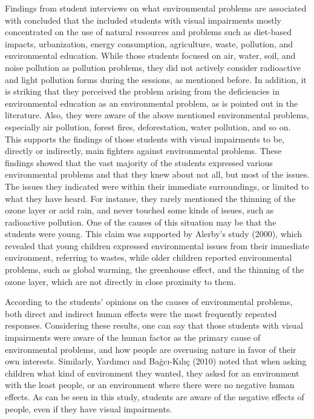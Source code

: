 \documentclass[11.5pt]{sig-alternate} %
\begin{document}
\begin{large}
Findings from student interviews on what environmental problems are associated with concluded that the included students with visual impairments mostly concentrated on the use of natural resources and problems such as diet-based impacts, urbanization, energy consumption, agriculture, waste, pollution, and environmental education. While those students focused on air, water, soil, and noise pollution as pollution problems, they did not actively consider radioactive and light pollution forms during the sessions, as mentioned before. In addition, it is striking that they perceived the problem arising from the deficiencies in environmental education as an environmental problem, as is pointed out in the literature.  Also, they were aware of the above mentioned environmental problems, especially air pollution, forest fires, deforestation, water pollution, and so on. This supports the findings of those students with visual impairments to be, directly or indirectly, main fighters against environmental problems. These findings showed that the vast majority of the students expressed various environmental problems and that they knew about not all, but most of the issues. The issues they indicated were within their immediate surroundings, or limited to what they have heard. For instance, they rarely mentioned the thinning of the ozone layer or acid rain, and never touched some kinds of issues, such as radioactive pollution. One of the causes of this situation may be that the students were young. This claim was supported by Alerby’s study (2000), which revealed that young children expressed environmental issues from their immediate environment, referring to wastes, while older children reported environmental problems, such as global warming, the greenhouse effect, and the thinning of the ozone layer, which are not directly in close proximity to them.

According to the students’ opinions on the causes of environmental problems, both direct and indirect human effects were the most frequently repeated responses. Considering these results, one can say that those students with visual impairments were aware of the human factor as the primary cause of environmental problems, and how people are overusing nature in favor of their own interests. Similarly, Yardımcı and Bağcı-Kılıç (2010) noted that when asking children what kind of environment they wanted, they asked for an environment with the least people, or an environment where there were no negative human effects. As can be seen in this study, students are aware of the negative effects of people, even if they have visual impairments. 

\end{large}
\clearpage 
\end{document}
